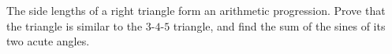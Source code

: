The side lengths of a right triangle form an arithmetic progression. Prove that the triangle is similar to the $3$-$4$-$5$ triangle, and find the sum of the sines of its two acute angles.
